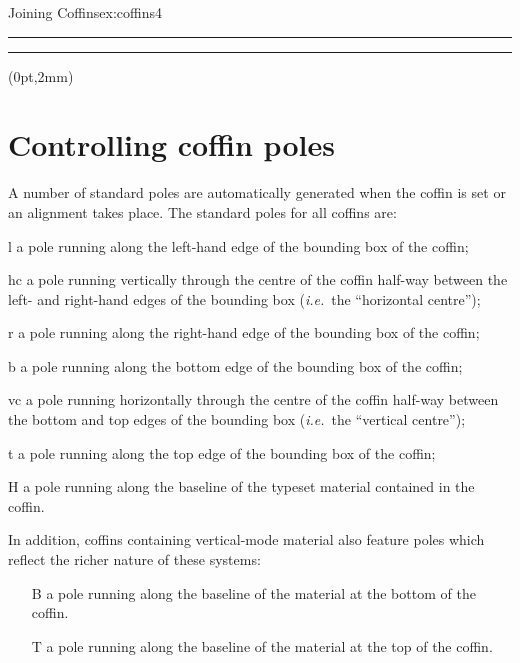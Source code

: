 \begin{texexample}{Joining Coffins}{ex:coffins4}
\SetHorizontalCoffin\ExampleCoffin
   {\color{red}\rule{3cm}{1pc}} 
\SetHorizontalCoffin\ExampleCoffinTwo
   {\color{green}\rule{3cm}{1pc}}    
\JoinCoffins\Result\ExampleCoffin   
\JoinCoffins*{} \ExampleCoffinTwo [t,l](0pt,2mm)
\TypesetCoffin\Result
\end{texexample}   
   
\section{Controlling coffin poles}

 A number of standard poles are automatically generated when the coffin
 is set or an alignment takes place. The standard poles for all coffins
 are:
 \begin{marglist}
   \item[l] a pole running along the left-hand edge of the bounding
     box of the coffin;
   \item[hc] a pole running vertically through the centre of the coffin
     half-way between the left- and right-hand edges of the bounding
       box (\emph{i.e.}~the \enquote{horizontal centre});
   \item[r] a pole running along the right-hand edge of the bounding
     box of the coffin;
   \item[b] a pole running along the bottom edge of the bounding
     box of the coffin;
   \item[vc] a pole running horizontally through the centre of the
     coffin half-way between the bottom and top edges of the bounding
     box (\emph{i.e.}~the \enquote{vertical centre});
   \item[t] a pole running along the top edge of the bounding
     box of the coffin;
   \item[H] a pole running along the baseline of the typeset material
     contained in the coffin.
 \end{marglist}
 In addition, coffins containing vertical-mode material also
 feature poles which reflect the richer nature of these systems:
 \begin{itemize}
   \item[B] a pole running along the baseline of the material at the
     bottom of the coffin.
   \item[T] a pole running along the baseline of the material at the top
     of the coffin.
 \end{itemize}  
 
